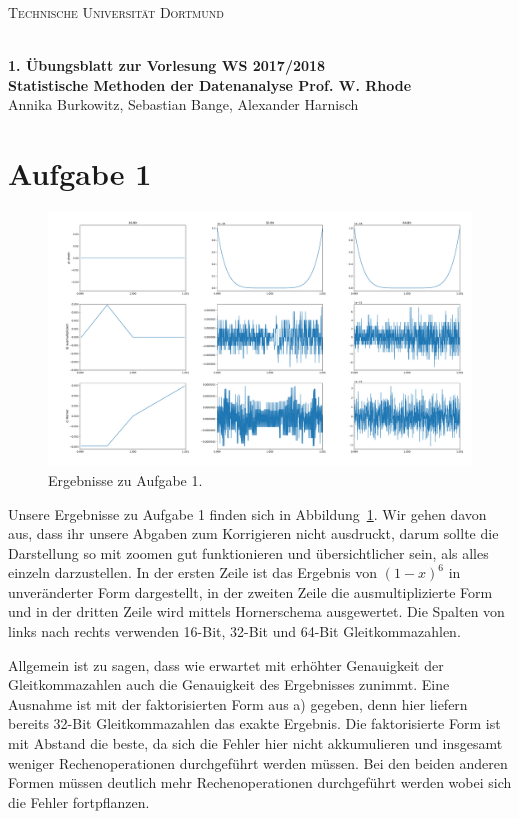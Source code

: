 \documentclass[a4paper, 11pt]{article}
\begin{document}
\noindent
\centerline{\small{\textsc{Technische Universität Dortmund}}} \\
\large{\textbf{1. Übungsblatt zur Vorlesung \hfill WS 2017/2018 \\
Statistische Methoden der Datenanalyse \hfill Prof. W. Rhode}} \\
Annika Burkowitz, Sebastian Bange, Alexander Harnisch \\
\noindent\makebox[\linewidth]{\rule{\textwidth}{0.4pt}}

\section*{Aufgabe 1}
\begin{figure}
    \centering
    \includegraphics[width=\textwidth]{../A01/A1.pdf}
    \caption{Ergebnisse zu Aufgabe 1.}
    \label{fig:a1}
\end{figure}
Unsere Ergebnisse zu Aufgabe 1 finden sich in Abbildung~\ref{fig:a1}. Wir gehen davon aus, dass ihr unsere Abgaben zum Korrigieren nicht ausdruckt, darum sollte die Darstellung so mit zoomen gut funktionieren und übersichtlicher sein, als alles einzeln darzustellen. In der ersten Zeile ist das Ergebnis von $(1-x)^6$ in unveränderter Form dargestellt, in der zweiten Zeile die ausmultiplizierte Form und in der dritten Zeile wird mittels Hornerschema ausgewertet. Die Spalten von links nach rechts verwenden 16-Bit, 32-Bit und 64-Bit Gleitkommazahlen.

Allgemein ist zu sagen, dass wie erwartet mit erhöhter Genauigkeit der Gleitkommazahlen auch die Genauigkeit des Ergebnisses zunimmt. Eine Ausnahme ist mit der faktorisierten Form aus a) gegeben, denn hier liefern bereits 32-Bit Gleitkommazahlen das exakte Ergebnis. Die faktorisierte Form ist mit Abstand die beste, da sich die Fehler hier nicht akkumulieren und insgesamt weniger Rechenoperationen durchgeführt werden müssen. Bei den beiden anderen Formen müssen deutlich mehr Rechenoperationen durchgeführt werden wobei sich die Fehler fortpflanzen.
\end{document}
